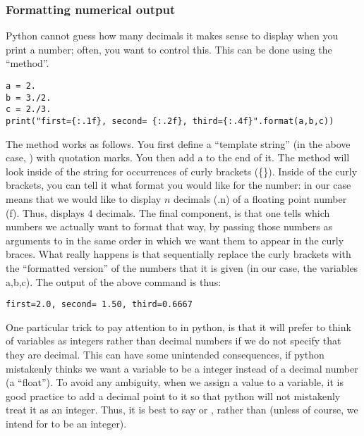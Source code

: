 \subsubsection{Formatting numerical output}
Python cannot guess how many decimals it makes sense to display when you print a number; often, you want to control this. This can be done using the  ``method''.
\begin{lstlisting}[frame=single] 
a = 2. 
b = 3./2.
c = 2./3.
print("first={:.1f}, second= {:.2f}, third={:.4f}".format(a,b,c))
\end{lstlisting}
The  method works as follows. You first define a ``template string'' (in the above case, ) with quotation marks. You then add a  to the end of it. The  method will look inside of the string for occurrences of curly brackets (\{\}). Inside of the curly brackets, you can tell it what format you would like for the number: in our case  means that we would like to display $n$ decimals (.n) of a floating point number (f). Thus,  displays 4 decimals. The final component, is that one tells  which numbers we actually want to format that way, by passing those numbers as arguments to  in the same order in which we want them to appear in the curly braces. What really happens is that  sequentially replace the curly brackets with the ``formatted version'' of the numbers that it is given (in our case, the variables a,b,c).
The output of the above command is thus:
\begin{verbatim}
first=2.0, second= 1.50, third=0.6667
\end{verbatim}
One particular trick to pay attention to in python, is that it will prefer to think of variables as integers rather than decimal numbers if we do not specify that they are decimal. This can have some unintended consequences, if python mistakenly thinks we want a variable to be a integer instead of a decimal number (a ``float''). To avoid any ambiguity, when we assign a value to a variable, it is good practice to add a decimal point to it so that python will not mistakenly treat it as an integer. Thus, it is best to say  or , rather than  (unless of course, we intend for  to be an integer).


